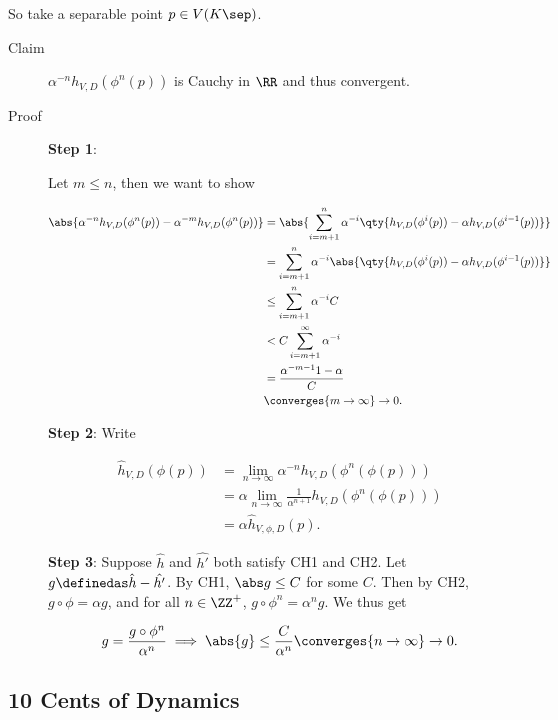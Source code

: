 So take a separable point \(p\in V(K\sep)\).

\begin{description}
\item[Claim]
\(\alpha^{-n} h_{V, D}(\phi^n(p))\) is Cauchy in \(\RR\) and thus
convergent.
\item[Proof]
\textbf{Step 1}:

Let \(m\leq n\), then we want to show

\begin{align*}
\abs{ \alpha^{-n} h_{V, D}( \phi^n (p) ) - \alpha^{-m} h_{V, D}( \phi^n (p) ) } 
&=
\abs{ \sum_{i=m+1}^n \alpha^{-i} \qty{ h_{V, D} (\phi^i(p)) - \alpha h_{V, D}( \phi^{i-1}(p)  )  }  } \\
&=
\sum_{i=m+1}^n \alpha^{-i} \abs{ \qty{ h_{V, D} (\phi^i(p)) - \alpha h_{V, D}( \phi^{i-1}(p)  )  }  } \\
&\leq 
\sum_{i=m+1}^n \alpha^{-i} C \\
&<
C \sum_{i=m+1}^\infty \alpha^{-i}\\
&= \frac{\alpha^{-m-1}{1-\alpha}} C \\
&\converges{m\to\infty}\to 0
.\end{align*}

\textbf{Step 2}: Write

\begin{align*}
\hat h_{V, D}(\phi(p)) 
&=
\lim_{n\to\infty} \alpha^{-n} h_{V, D} ( \phi^n(\phi(p))  ) \\
&=
\alpha \lim_{n\to\infty} \frac{1}{\alpha^{n+1}} h_{V, D} ( \phi^n(\phi(p))  ) \\
&=
\alpha \hat h_{V, \phi, D}(p)
.\end{align*}

\textbf{Step 3}: Suppose \(\hat h\) and \(\hat{h'}\) both satisfy CH1
and CH2. Let \(g\definedas \hat h - \hat{h'}\). By CH1,
\(\abs g \leq C\) for some \(C\). Then by CH2,
\(g\circ \phi = \alpha g\), and for all \(n\in \ZZ^+\),
\(g\circ \phi^n = \alpha^n g\). We thus get

\begin{align*}
g = \frac{g\circ \phi^n}{\alpha^n} \implies \abs{g} \leq \frac{C}{\alpha^n} \converges{n\to\infty}\to 0
.\end{align*}
\end{description}

\hypertarget{cents-of-dynamics}{%
\subsection{10 Cents of Dynamics}\label{cents-of-dynamics}}

